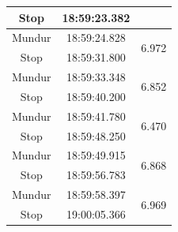 \begin{longtable}{|c|c|c|}
  Stop   & 18:59:23.382 &                        \\ \hline
  Mundur & 18:59:24.828 & \multirow{2}{*}{6.972} \\ \cline{1-2}
  Stop   & 18:59:31.800 &                        \\ \hline
  Mundur & 18:59:33.348 & \multirow{2}{*}{6.852} \\ \cline{1-2}
  Stop   & 18:59:40.200 &                        \\ \hline
  Mundur & 18:59:41.780 & \multirow{2}{*}{6.470} \\ \cline{1-2}
  Stop   & 18:59:48.250 &                        \\ \hline
  Mundur & 18:59:49.915 & \multirow{2}{*}{6.868} \\ \cline{1-2}
  Stop   & 18:59:56.783 &                        \\ \hline
  Mundur & 18:59:58.397 & \multirow{2}{*}{6.969} \\ \cline{1-2}
  Stop   & 19:00:05.366 &                        \\ \hline
\end{longtable}
